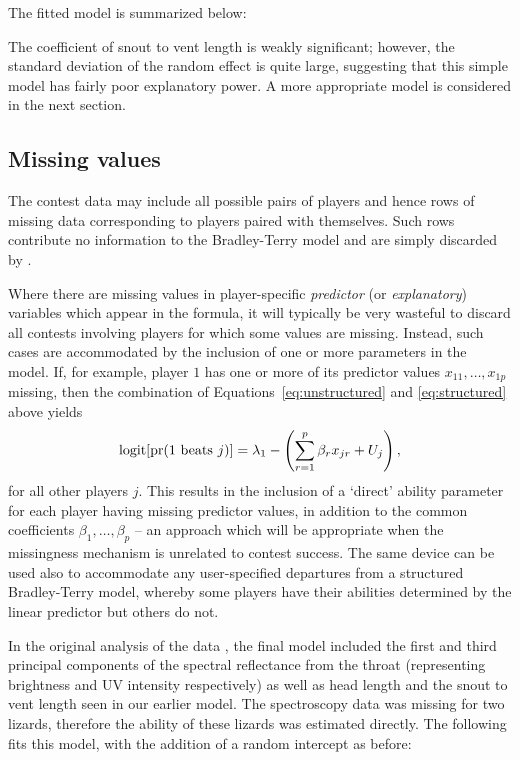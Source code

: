 The fitted model is summarized below:

\Rcodeplaceholder{}

The coefficient of snout to vent length is weakly significant; however, the
standard deviation of the random effect is quite large,
suggesting that this simple model has fairly poor explanatory power.
A more appropriate model is considered in the next section.

\subsection{Missing values}

The contest data may include all possible pairs of players and hence rows of
missing data corresponding to players paired with themselves. Such rows
contribute no information to the Bradley-Terry model and are simply discarded by
.

Where there are missing values in player-specific \emph{predictor} (or
\emph{explanatory}) variables which appear in the formula, it
will typically be very wasteful to discard all contests involving players for
which some values are missing. Instead, such cases are accommodated by the
inclusion of one or more parameters in the model.  If, for example, player $1$
has one or more of its predictor values $x_{11},\ldots,x_{1p}$ missing, then the
combination of Equations~\ref{eq:unstructured} and \ref{eq:structured} above yields
\begin{equation}
\mathop{\rm logit}[\mathop{\rm pr}(1\ \mathrm{beats}\ j)]=\lambda_1 - \left(\sum_{r=1}^p\beta_rx_{jr} + U_j\right),
\end{equation}
for all other players $j$.  This results in the inclusion of a `direct' ability
parameter for each player having missing predictor values, in addition to the
common coefficients $\beta_1,\ldots,\beta_p$ -- an approach which will be
appropriate when the missingness mechanism is unrelated to contest success.  The
same device can be used also to accommodate any user-specified departures from a
structured Bradley-Terry model, whereby some players have their abilities
determined by the linear predictor but others do not.

In the original analysis of the  data \citep{whit:06}, the
final model included the first and third principal components
of the spectral reflectance from the throat (representing brightness and UV intensity
respectively) as well as head length and the snout to vent length seen in our
earlier model. The spectroscopy data was missing for two lizards, therefore
the ability of these lizards was estimated directly. The following fits this
model, with the addition of a random intercept as before:

